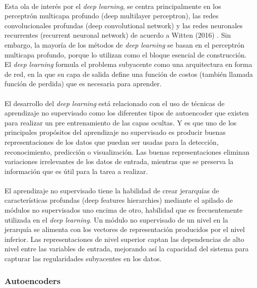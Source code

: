 \documentclass[12pt]{article}%
\begin{document}
\paragraph{}
Esta ola de interés por el \textit{deep learning}, se centra principalmente en los perceptrón multicapa profundo (deep multilayer perceptron), las redes convolucionales profundas (deep convolutional network) y las redes neuronales recurrentes (recurrent neuronal network) de acuerdo a Witten (2016) \cite{mining}. Sin embargo, la mayoría de los métodos de \textit{deep learning} se basan en el perceptrón multicapa profundo, porque lo utilizan como el bloque esencial de construcción. El \textit{deep learning} formula el problema subyacente como una arquitectura en forma de red, en la que su capa de salida define una función de costos (también llamada función de perdida) que es necesaria para aprender.

\paragraph{}
El desarrollo del \textit{deep learning} está relacionado con el uso de técnicas de aprendizaje no supervisado como los diferentes tipos de autoencoder que existen para realizar un pre entrenamiento de las capas ocultas. Y es que uno de los principales propósitos del aprendizaje no supervisado es producir buenas representaciones de los datos \cite{ranzato} que puedan ser usadas para la detección, reconocimiento, predicción o visualización. Las buenas representaciones eliminan variaciones irrelevantes de los datos de entrada, mientras que se preserva la información que es útil para la tarea a realizar.

\paragraph{}
El aprendizaje no supervisado tiene la habilidad de crear jerarquías de características profundas (deep features hierarchies) mediante el apilado de módulos no supervisados uno encima de otro, habilidad que es frecuentemente utilizada en el \textit{deep learning}. Un módulo no supervisado de un nivel en la jerarquía se alimenta con los vectores de representación producidos por el nivel inferior. Las representaciones de nivel superior captan las dependencias de alto nivel entre las variables de entrada, mejorando así la capacidad del sistema para capturar las regularidades subyacentes en los datos.

\subsubsection{Autoencoders}
\end{document}
